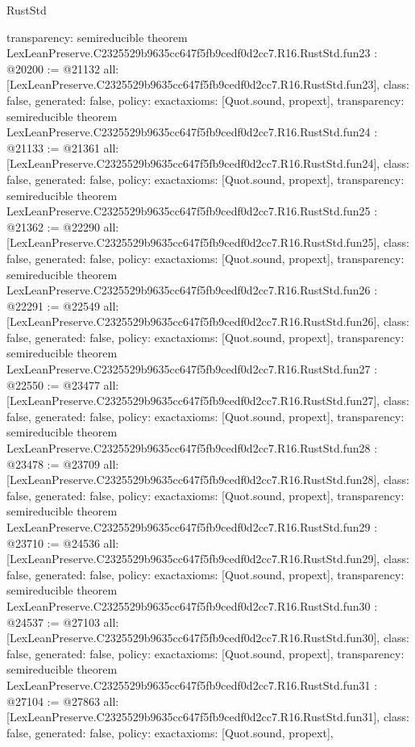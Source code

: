 \begin{lexlean}{RustStd}
\begin{coremodule}
{  transparency: semireducible
}
theorem LexLeanPreserve.C2325529b9635cc647f5fb9cedf0d2cc7.R16.RustStd.fun23 : @20200 := @21132 {
  all: [LexLeanPreserve.C2325529b9635cc647f5fb9cedf0d2cc7.R16.RustStd.fun23],
  class: false,
  generated: false,
  policy: exact{axioms: [Quot.sound, propext]},
  transparency: semireducible
}
theorem LexLeanPreserve.C2325529b9635cc647f5fb9cedf0d2cc7.R16.RustStd.fun24 : @21133 := @21361 {
  all: [LexLeanPreserve.C2325529b9635cc647f5fb9cedf0d2cc7.R16.RustStd.fun24],
  class: false,
  generated: false,
  policy: exact{axioms: [Quot.sound, propext]},
  transparency: semireducible
}
theorem LexLeanPreserve.C2325529b9635cc647f5fb9cedf0d2cc7.R16.RustStd.fun25 : @21362 := @22290 {
  all: [LexLeanPreserve.C2325529b9635cc647f5fb9cedf0d2cc7.R16.RustStd.fun25],
  class: false,
  generated: false,
  policy: exact{axioms: [Quot.sound, propext]},
  transparency: semireducible
}
theorem LexLeanPreserve.C2325529b9635cc647f5fb9cedf0d2cc7.R16.RustStd.fun26 : @22291 := @22549 {
  all: [LexLeanPreserve.C2325529b9635cc647f5fb9cedf0d2cc7.R16.RustStd.fun26],
  class: false,
  generated: false,
  policy: exact{axioms: [Quot.sound, propext]},
  transparency: semireducible
}
theorem LexLeanPreserve.C2325529b9635cc647f5fb9cedf0d2cc7.R16.RustStd.fun27 : @22550 := @23477 {
  all: [LexLeanPreserve.C2325529b9635cc647f5fb9cedf0d2cc7.R16.RustStd.fun27],
  class: false,
  generated: false,
  policy: exact{axioms: [Quot.sound, propext]},
  transparency: semireducible
}
theorem LexLeanPreserve.C2325529b9635cc647f5fb9cedf0d2cc7.R16.RustStd.fun28 : @23478 := @23709 {
  all: [LexLeanPreserve.C2325529b9635cc647f5fb9cedf0d2cc7.R16.RustStd.fun28],
  class: false,
  generated: false,
  policy: exact{axioms: [Quot.sound, propext]},
  transparency: semireducible
}
theorem LexLeanPreserve.C2325529b9635cc647f5fb9cedf0d2cc7.R16.RustStd.fun29 : @23710 := @24536 {
  all: [LexLeanPreserve.C2325529b9635cc647f5fb9cedf0d2cc7.R16.RustStd.fun29],
  class: false,
  generated: false,
  policy: exact{axioms: [Quot.sound, propext]},
  transparency: semireducible
}
theorem LexLeanPreserve.C2325529b9635cc647f5fb9cedf0d2cc7.R16.RustStd.fun30 : @24537 := @27103 {
  all: [LexLeanPreserve.C2325529b9635cc647f5fb9cedf0d2cc7.R16.RustStd.fun30],
  class: false,
  generated: false,
  policy: exact{axioms: [Quot.sound, propext]},
  transparency: semireducible
}
theorem LexLeanPreserve.C2325529b9635cc647f5fb9cedf0d2cc7.R16.RustStd.fun31 : @27104 := @27863 {
  all: [LexLeanPreserve.C2325529b9635cc647f5fb9cedf0d2cc7.R16.RustStd.fun31],
  class: false,
  generated: false,
  policy: exact{axioms: [Quot.sound, propext]},
}
\end{coremodule}
\end{lexlean}
